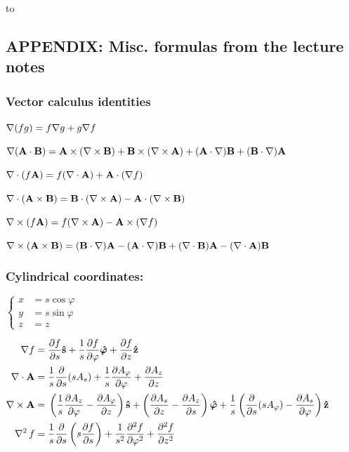 \documentclass[12pt,a4paper]{article}
\providecommand{\thisistheend}{\vfill{\hbox to \textwidth{\hfil * * * * * * * * * * * * * * *\hfil}}\vfill}
\begin{document}
\thisistheend
\pagebreak

\hypertarget{appendix-misc.-formulas-from-the-lecture-notes}{%
\subsection{APPENDIX: Misc. formulas from the lecture
notes}\label{appendix-misc.-formulas-from-the-lecture-notes}}

\hypertarget{vector-calculus-identities}{%
\subsubsection{Vector calculus
identities}\label{vector-calculus-identities}}

\(\nabla (fg) = f\nabla g + g\nabla f\)

\(\nabla (\mathbf{A}\cdot\mathbf{B}) = \mathbf{A}\times(\nabla\times\mathbf{B}) + \mathbf{B}\times(\nabla\times\mathbf{A}) + (\mathbf{A}\cdot\nabla)\mathbf{B} + (\mathbf{B}\cdot\nabla)\mathbf{A}\)

\(\nabla\cdot (f\mathbf{A}) = f (\nabla\cdot \mathbf{A}) + \mathbf{A}\cdot(\nabla f)\)

\(\nabla\cdot (\mathbf{A}\times\mathbf{B}) = \mathbf{B}\cdot(\nabla\times\mathbf{A}) - \mathbf{A}\cdot(\nabla\times\mathbf{B})\)

\(\nabla\times (f\mathbf{A}) = f(\nabla\times\mathbf{A}) - \mathbf{A}\times(\nabla f)\)

\(\nabla\times (\mathbf{A}\times\mathbf{B}) = (\mathbf{B}\cdot\nabla)\mathbf{A} - (\mathbf{A}\cdot\nabla)\mathbf{B} + (\nabla\cdot\mathbf{B})\mathbf{A} - (\nabla\cdot\mathbf{A})\mathbf{B}\)

\hypertarget{cylindrical-coordinates}{%
\subsubsection{Cylindrical coordinates:}\label{cylindrical-coordinates}}

\(\left\{\begin{aligned} x&=s \cos \varphi \\ y&=s \sin \varphi \\ z&=z \end{aligned}\right.\)

\(\begin{aligned} \nabla f={} & {\frac {\partial f}{\partial s }}{\mathbf {\hat {s }}}+{\frac {1}{s }}{\frac {\partial f}{\partial \varphi }}{\bm{\hat \varphi}}+{\frac {\partial f}{\partial z}}\mathbf {\hat {z}} \\[1pt] \nabla\cdot\mathbf{A} ={}&{\frac {1}{s }}{\frac {\partial }{\partial s }}(s A_{s })+{\frac {1}{s }}{\frac {\partial A_{\varphi }}{\partial \varphi }}+{\frac {\partial A_{z}}{\partial z}}\\[1pt] \nabla\times \mathbf{A} ={}& \left({\frac {1}{s }}{\frac {\partial A_{z}}{\partial \varphi }}-{\frac {\partial A_{\varphi }}{\partial z}}\right){\mathbf {\hat {s }}}+\left({\frac {\partial A_{s }}{\partial z}}-{\frac {\partial A_{z}}{\partial s }}\right){\bm{\hat \varphi}}+{\frac {1}{s }}\left({\frac {\partial }{\partial s }}(s A_{\varphi })-{\frac {\partial A_{s }}{\partial \varphi }}\right)\mathbf {\hat {z}} \\[1pt] \mathop{{}\nabla^2}\nolimits f={}& {\frac {1}{s }}{\frac {\partial }{\partial s }}\left(s {\frac {\partial f}{\partial s }}\right)+{\frac {1}{s ^{2}}}{\frac {\partial ^{2}f}{\partial \varphi ^{2}}}+{\frac {\partial ^{2}f}{\partial z^{2}}} \end{aligned}\)
\end{document}
